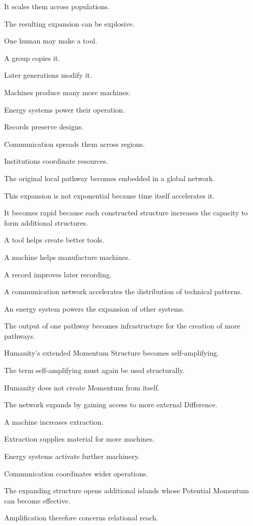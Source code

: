 It scales them across populations.

The resulting expansion can be explosive.

One human may make a tool.

A group copies it.

Later generations modify it.

Machines produce many more machines.

Energy systems power their operation.

Records preserve designs.

Communication spreads them across regions.

Institutions coordinate resources.

The original local pathway becomes embedded in a global network.

This expansion is not exponential because time itself accelerates it.

It becomes rapid because each constructed structure increases the capacity to form additional structures.

A tool helps create better tools.

A machine helps manufacture machines.

A record improves later recording.

A communication network accelerates the distribution of technical patterns.

An energy system powers the expansion of other systems.

The output of one pathway becomes infrastructure for the creation of more pathways.

Humanity’s extended Momentum Structure becomes self-amplifying.

The term self-amplifying must again be used structurally.

Humanity does not create Momentum from itself.

The network expands by gaining access to more external Difference.

A machine increases extraction.

Extraction supplies material for more machines.

Energy systems activate further machinery.

Communication coordinates wider operations.

The expanding structure opens additional islands whose Potential Momentum can become effective.

Amplification therefore concerns relational reach.

